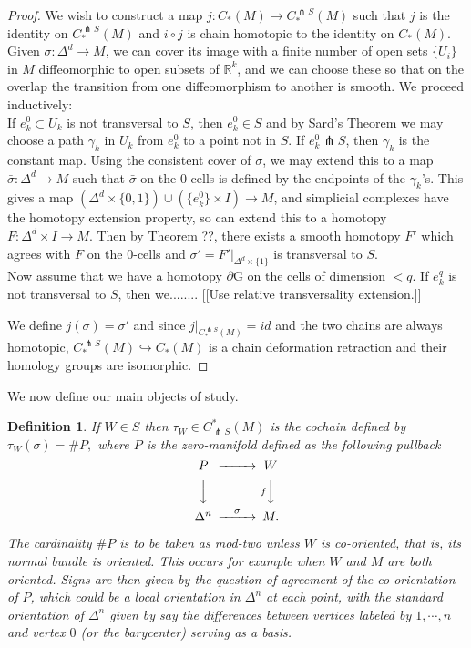 \documentclass{amsart}          %
\newtheorem{definition}[theorem]{Definition}
\newcommand{\R}{\mathbb R}
\begin{document}
\begin{proof} We wish to construct a map $j:C_{*}(M) \rightarrow C^{\pitchfork S}_{*}(M)$ such that $j$ is the identity on $C^{\pitchfork S}_{*}(M)$ and 
$i \circ j$ is chain homotopic to the identity on $C_{*}(M)$. Given $\sigma:\Delta^d \rightarrow M$, we can cover its image with a finite number of 
open sets $\{U_i\}$ in $M$ diffeomorphic to open subsets of $\R^k$, and we can choose these so that on the overlap the transition from one 
diffeomorphism to another is smooth. We proceed inductively: \\If $e^0_k \subset U_k$ is not transversal to $S$, then $e^0_k \in S$ and by 
Sard's Theorem we may choose a path $\gamma_k$ in $U_k$ from $e^0_k$ to a point not in $S$. If $e^0_k \pitchfork S$, then $\gamma_k$ is the 
constant map. Using the consistent cover of $\sigma$, we may extend this to a map $\bar{\sigma}:\Delta^d \rightarrow M$ such that $\bar{\sigma}$ 
on the 0-cells is defined by the endpoints of the $\gamma_k$'s. This gives a map 
$\left(\Delta^d \times \{0,1\} \right)\cup \left(\{e^0_k\} \times I \right)\rightarrow M$, and simplicial complexes have the homotopy extension property, 
so can extend this to a homotopy $F: \Delta^d \times I \rightarrow M$. Then by Theorem ??, there exists a smooth homotopy $F'$ which 
agrees with $F$ on the 0-cells and $\sigma'=\left.F'\right|_{\Delta^d \times \{1\}}$ is transversal to $S$.\\
Now assume that we have a homotopy $\partial$G on the cells of dimension $<q$. If $e^q_k $ is not transversal to $S$, then we........  
[[Use relative transversality
extension.]]


We define $j(\sigma) = \sigma'$ and since $\left.j\right|_{C^{\pitchfork S}_{*}(M)}=id$ and the two chains are always homotopic, $C^{\pitchfork S}_{*}(M) \hookrightarrow C_{*}(M)$ is a chain deformation retraction and their homology groups are isomorphic.
\end{proof}

We now define our main objects of study.
\begin{definition}
If $W \in S$ then $\tau_{W} \in C^{*}_{\pitchfork S}(M)$ is the cochain defined by $\tau_W (\sigma) = \# P,$  where $P$ is
the  zero-manifold defined as the following pullback
$$
\begin{CD}
P @>>> W\\
@VVV  @VfVV\\
\Delta^n @>\sigma>> M.
\end{CD}
$$

The cardinality $\# P$ is to be taken as mod-two unless $W$  is co-oriented, that is, its normal bundle is oriented.  This occurs
for example when $W$ and $M$ are both oriented.  Signs are then given by the question of agreement of the co-orientation of $P$, 
which could be a local orientation in $\Delta^n$ at each point, with the standard orientation of $\Delta^n$ given by say the differences between vertices labeled by $1, \cdots, n$ and vertex $0$ (or the barycenter) serving as a basis.
\end{definition}
\end{document}

